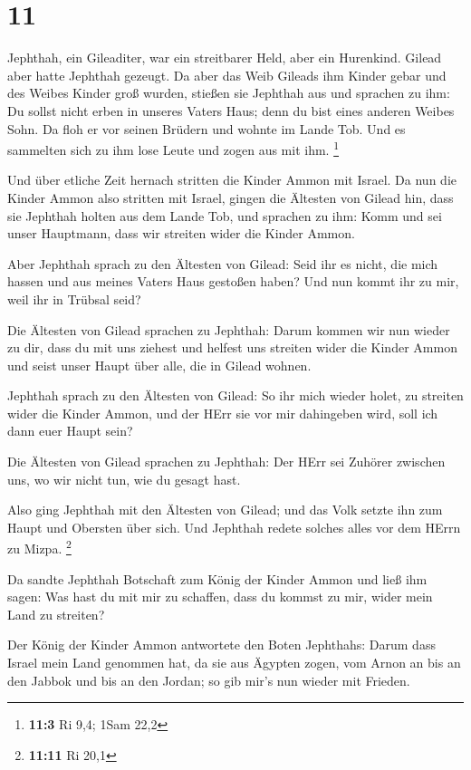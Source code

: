 \hypertarget{section-4}{%
\section{11}\label{section-4}}

 Jephthah, ein Gileaditer, war ein streitbarer Held, aber
ein Hurenkind. Gilead aber hatte Jephthah gezeugt.  Da aber
das Weib Gileads ihm Kinder gebar und des Weibes Kinder groß wurden,
stießen sie Jephthah aus und sprachen zu ihm: Du sollst nicht erben in
unseres Vaters Haus; denn du bist eines anderen Weibes Sohn.
 Da floh er vor seinen Brüdern und wohnte im Lande Tob. Und
es sammelten sich zu ihm lose Leute und zogen aus mit ihm. \footnote{\textbf{11:3}
  Ri 9,4; 1Sam 22,2}

 Und über etliche Zeit hernach stritten die Kinder Ammon mit
Israel.  Da nun die Kinder Ammon also stritten mit Israel,
gingen die Ältesten von Gilead hin, dass sie Jephthah holten aus dem
Lande Tob,  und sprachen zu ihm: Komm und sei unser
Hauptmann, dass wir streiten wider die Kinder Ammon.

 Aber Jephthah sprach zu den Ältesten von Gilead: Seid ihr
es nicht, die mich hassen und aus meines Vaters Haus gestoßen haben? Und
nun kommt ihr zu mir, weil ihr in Trübsal seid?

 Die Ältesten von Gilead sprachen zu Jephthah: Darum kommen
wir nun wieder zu dir, dass du mit uns ziehest und helfest uns streiten
wider die Kinder Ammon und seist unser Haupt über alle, die in Gilead
wohnen.

 Jephthah sprach zu den Ältesten von Gilead: So ihr mich
wieder holet, zu streiten wider die Kinder Ammon, und der HErr sie vor
mir dahingeben wird, soll ich dann euer Haupt sein?

 Die Ältesten von Gilead sprachen zu Jephthah: Der HErr sei
Zuhörer zwischen uns, wo wir nicht tun, wie du gesagt hast.

 Also ging Jephthah mit den Ältesten von Gilead; und das
Volk setzte ihn zum Haupt und Obersten über sich. Und Jephthah redete
solches alles vor dem HErrn zu Mizpa. \footnote{\textbf{11:11} Ri 20,1}

 Da sandte Jephthah Botschaft zum König der Kinder Ammon
und ließ ihm sagen: Was hast du mit mir zu schaffen, dass du kommst zu
mir, wider mein Land zu streiten?

 Der König der Kinder Ammon antwortete den Boten Jephthahs:
Darum dass Israel mein Land genommen hat, da sie aus Ägypten zogen, vom
Arnon an bis an den Jabbok und bis an den Jordan; so gib mir's nun
wieder mit Frieden.

